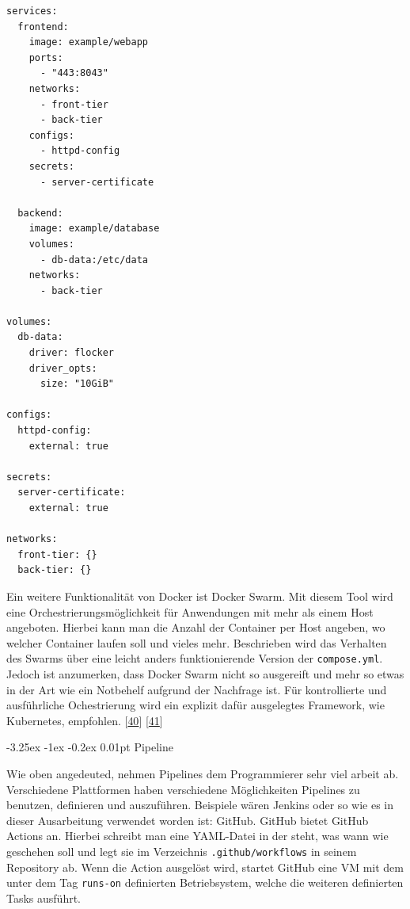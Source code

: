 \documentclass[
    headings=optiontotocandhead,%
    twoside,
    numbers=noenddot,%
    12pt, %
    titlepage, %
    parskip=full, %
    listof=leveldown, 
    numbers=noenddot, %
    a4paper,DIV=14,
    BCOR=15mm,
]{scrbook}
\makeatletter
\newcommand{\passthrough}[1]{#1}
\renewcommand\paragraph{\@startsection{paragraph}{4}{\z@}%
    {-3.25ex \@plus -1ex \@minus -0.2ex}%
    {0.01pt}%
    {\raggedsection\normalfont\sectfont\nobreak\size@paragraph}%
  }
\makeatother
\begin{document}
\begin{lstlisting}[caption={Beispiel eines docker compose files}]
services:
  frontend:
    image: example/webapp
    ports:
      - "443:8043"
    networks:
      - front-tier
      - back-tier
    configs:
      - httpd-config
    secrets:
      - server-certificate

  backend:
    image: example/database
    volumes:
      - db-data:/etc/data
    networks:
      - back-tier

volumes:
  db-data:
    driver: flocker
    driver_opts:
      size: "10GiB"

configs:
  httpd-config:
    external: true

secrets:
  server-certificate:
    external: true

networks:
  front-tier: {}
  back-tier: {}
\end{lstlisting}

Ein weitere Funktionalität von Docker ist Docker Swarm. Mit diesem Tool
wird eine Orchestrierungsmöglichkeit für Anwendungen mit mehr als einem
Host angeboten. Hierbei kann man die Anzahl der Container per Host
angeben, wo welcher Container laufen soll und vieles mehr. Beschrieben
wird das Verhalten des Swarms über eine leicht anders funktionierende
Version der \passthrough{\lstinline!compose.yml!}. Jedoch ist
anzumerken, dass Docker Swarm nicht so ausgereift und mehr so etwas in
der Art wie ein Notbehelf aufgrund der Nachfrage ist. Für kontrollierte
und ausführliche Ochestrierung wird ein explizit dafür ausgelegtes
Framework, wie Kubernetes, empfohlen.
{[}\protect\hyperlink{ref-docker-swarm}{40}{]}
{[}\protect\hyperlink{ref-circleci-blog}{41}{]}

\hypertarget{pipeline}{%
\paragraph{Pipeline}\label{pipeline}}

Wie oben angedeuted, nehmen Pipelines dem Programmierer sehr viel arbeit
ab. Verschiedene Plattformen haben verschiedene Möglichkeiten Pipelines
zu benutzen, definieren und auszuführen. Beispiele wären Jenkins oder so
wie es in dieser Ausarbeitung verwendet worden ist: GitHub. GitHub
bietet GitHub Actions an. Hierbei schreibt man eine YAML-Datei in der
steht, was wann wie geschehen soll und legt sie im Verzeichnis
\passthrough{\lstinline!.github/workflows!} in seinem Repository ab.
Wenn die Action ausgelöst wird, startet GitHub eine VM mit dem unter dem
Tag \passthrough{\lstinline!runs-on!} definierten Betriebsystem, welche
die weiteren definierten Tasks ausführt.
\end{document}
